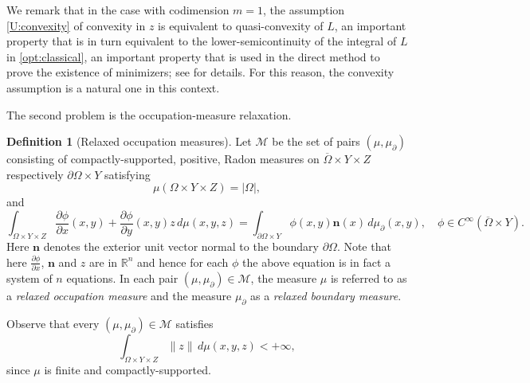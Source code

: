 \documentclass{article}
\newcommand{\R}{\mathbb{R}}
\theoremstyle{definition}
\newtheorem{definition}[theorem]{Definition}
\theoremstyle{remark}
\begin{document}
We remark that in the case with codimension $m=1$, the assumption \ref{U:convexity} of convexity in $z$ is equivalent to quasi-convexity of $L$, an important property that is in turn equivalent to the lower-semicontinuity of the integral of $L$ in \eqref{opt:classical}, an important property that is used in the direct method to prove the existence of minimizers; see \cite{dacorogna} for details. For this reason, the convexity assumption is a natural one in this context.
 

%
%
%

The second problem is the occupation-measure relaxation. 

\begin{definition}[Relaxed occupation measures]\label{def:M}
 Let $\mathcal M$ be the set of pairs $(\mu,\mu_\partial)$ consisting of compactly-supported, positive, Radon measures on $\overline\Omega\times Y\times Z$ respectively $\partial\Omega\times Y$ satisfying
 \begin{equation}\label{eq:measureomega}
 \mu(\Omega\times Y\times Z)=|\Omega|,
\end{equation}
and
\begin{equation}\label{eq:boundarymeasure}
  \int_{\Omega\times Y\times Z}\frac{\partial\phi}{\partial x}(x,y)+\frac{\partial \phi}{\partial y}(x,y)z\,d\mu(x,y,z)
  =\int_{\partial\Omega\times Y} \phi(x,y)\mathbf n(x)\,d\mu_\partial(x,y),\quad \phi\in C^\infty(\overline\Omega\times Y).
 \end{equation}
%
Here $\mathbf n$ denotes the exterior unit vector normal to the boundary $\partial\Omega$.
Note that here $\frac{\partial \phi}{\partial x}$, $\mathbf{n}$ and $z$ are in $\R^n$ and hence for each $\phi$ the above equation is in fact a system of $n$ equations.
 In each pair $(\mu,\mu_\partial)\in \mathcal M$, the measure $\mu$ is referred to as a \emph{relaxed occupation measure} and the measure $\mu_\partial$ as a \emph{relaxed boundary measure}.
 \end{definition}

 Observe that every $(\mu,\mu_\partial)\in \mathcal M$ satisfies
\begin{equation}\label{eq:finitemoment s}
\int_{\Omega\times Y\times Z}\|z\|\,d\mu(x,y,z)<+\infty,
\end{equation}
since $\mu$ is finite and compactly-supported.
\end{document}
